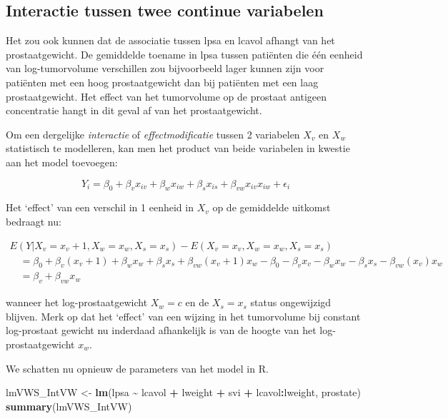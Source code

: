 \documentclass[
  12pt,dutch,coursenotes]{book}
\newenvironment{Shaded}{\begin{snugshade}}{\end{snugshade}}
\newcommand{\KeywordTok}[1]{\textcolor[rgb]{0.13,0.29,0.53}{\textbf{#1}}}
\newcommand{\NormalTok}[1]{#1}
\newcommand{\OperatorTok}[1]{\textcolor[rgb]{0.81,0.36,0.00}{\textbf{#1}}}
\newcommand{\StringTok}[1]{\textcolor[rgb]{0.31,0.60,0.02}{#1}}
\theoremstyle{definition}
\theoremstyle{definition}
\theoremstyle{definition}
\theoremstyle{remark}
\begin{document}
\hypertarget{sec:intCont}{%
\subsection{Interactie tussen twee continue variabelen}\label{sec:intCont}}

Het zou ook kunnen dat de associatie tussen lpsa en lcavol afhangt van het prostaatgewicht. De gemiddelde toename in lpsa tussen patiënten die één eenheid van log-tumorvolume verschillen zou bijvoorbeeld lager kunnen zijn voor patiënten met een hoog prostaatgewicht dan bij patiënten met een laag prostaatgewicht. Het effect van het tumorvolume op de prostaat antigeen concentratie hangt in dit geval af van het prostaatgewicht.

Om een dergelijke \textit{interactie} of \textit{effectmodificatie} tussen 2 variabelen \(X_v\) en \(X_w\) statistisch te modelleren, kan men het product van beide variabelen in kwestie aan het model toevoegen:

\[
Y_i = \beta_0 + \beta_v x_{iv} + \beta_w x_{iw} +\beta_s x_{is} + \beta_{vw} x_{iv}x_{iw} +\epsilon_i
\]

Het `effect' van een verschil in 1 eenheid in \(X_v\) op de gemiddelde uitkomst bedraagt nu:

\[
\begin{array}{l}
E(Y|X_v=x_v+1,X_w=x_w,X_s=x_s) − E(X_v=x_v,X_w=x_w,X_s=x_s) \\
\quad = \beta_0 + \beta_v (x_{v}+1) + \beta_w x_w +\beta_s x_{s} + \beta_{vw} (x_{v}+1) x_w - \beta_0 - \beta_v x_{v} - \beta_w x_w -\beta_s x_{s} - \beta_{vw} (x_{v}) x_w \\
\quad = \beta_v +  \beta_{vw} x_w
 \end{array}
\]

wanneer het log-prostaatgewicht \(X_w=c\) en de \(X_s=x_s\) status ongewijzigd blijven. Merk op dat het `effect' van een wijzing in het tumorvolume bij
constant log-prostaat gewicht nu inderdaad afhankelijk is van de hoogte van het log-prostaatgewicht \(x_w\).

We schatten nu opnieuw de parameters van het model in R.

\begin{Shaded}
\begin{Highlighting}[]
\NormalTok{lmVWS\_IntVW \textless{}{-}}\StringTok{ }\KeywordTok{lm}\NormalTok{(lpsa }\OperatorTok{\textasciitilde{}}\StringTok{ }\NormalTok{lcavol }\OperatorTok{+}\StringTok{ }\NormalTok{lweight }\OperatorTok{+}\StringTok{ }\NormalTok{svi }\OperatorTok{+}\StringTok{ }\NormalTok{lcavol}\OperatorTok{:}\NormalTok{lweight, }
\NormalTok{    prostate)}
\KeywordTok{summary}\NormalTok{(lmVWS\_IntVW)}
\end{Highlighting}
\end{Shaded}
\end{document}
